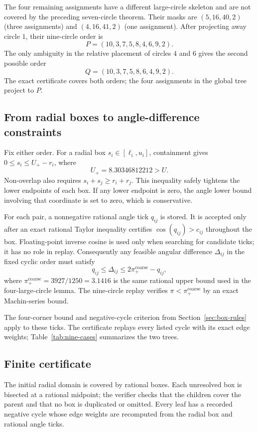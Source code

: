 \documentclass[11pt,a4paper]{article}
\theoremstyle{remark}
\newcommand{\Rcap}{U}
\begin{document}
The four remaining assignments have a different large-circle skeleton and
are not covered by the preceding seven-circle theorem.  Their masks are
$(5,16,40,2)$ (three assignments) and $(4,16,41,2)$ (one assignment).
After projecting away circle $1$, their nine-circle order is
\[
 P=(10,3,7,5,8,4,6,9,2).
\]
The only ambiguity in the relative placement of circles $4$ and $6$ gives
the second possible order
\[
 Q=(10,3,7,5,8,6,4,9,2).
\]
The exact certificate covers both orders; the four assignments in the global
tree project to $P$.

\subsection{From radial boxes to angle-difference constraints}

Fix either order.  For a radial box $s_i\in[\ell_i,u_i]$, containment gives
$0\le s_i\le\Rcap_+-r_i$, where
\[
  \Rcap_+=8.30346812212>\Rcap.
\]
Non-overlap also requires $s_i+s_j\ge r_i+r_j$.  This inequality safely
tightens the lower endpoints of each box.  If any lower endpoint is zero,
the angle lower bound involving that coordinate is set to zero, which is
conservative.

For each pair, a nonnegative rational angle tick $q_{ij}$ is stored.  It is
accepted only after an exact rational Taylor inequality certifies
$\cos(q_{ij})>c_{ij}$ throughout the box.  Floating-point inverse cosine is
used only when searching for candidate ticks; it has no role in replay.
Consequently any feasible angular difference $\Delta_{ij}$ in the fixed
cyclic order must satisfy
\[
  q_{ij}\le \Delta_{ij}\le 2\pi_+^{\mathrm{coarse}}-q_{ij},
\]
where $\pi_+^{\mathrm{coarse}}=3927/1250=3.1416$ is the same rational upper
bound used in the four-large-circle lemma.  The nine-circle replay verifies
$\pi<\pi_+^{\mathrm{coarse}}$ by an exact Machin-series bound.

The four-corner bound and negative-cycle criterion from
Section~\ref{sec:box-rules} apply to these ticks.  The certificate replays
every listed cycle with its exact edge weights; Table~\ref{tab:nine-cases}
summarizes the two trees.

\subsection{Finite certificate}

The initial radial domain is covered by rational boxes.  Each unresolved box
is bisected at a rational midpoint; the verifier checks that the children
cover the parent and that no box is duplicated or omitted.  Every leaf has
a recorded negative cycle whose edge weights are recomputed from the radial
box and rational angle ticks.
\end{document}
